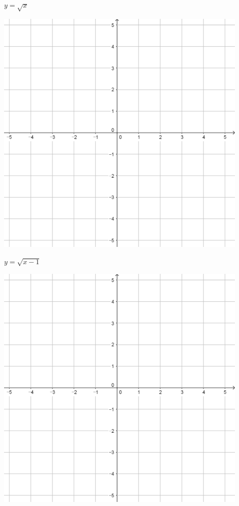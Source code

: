 \documentclass[a4paper]{oblivoir}
\begin{document}
\clearpage
\begin{minipage}{0.45\textwidth}\centering
\(y=\sqrt x\)
\par\bigskip\includegraphics[width=0.9\textwidth]{55}
\end{minipage}
\begin{minipage}{0.45\textwidth}\centering
\(y=\sqrt{x-1}\)
\par\bigskip\includegraphics[width=0.9\textwidth]{55}
\end{minipage}\bigskip\bigskip\par
\end{document}
